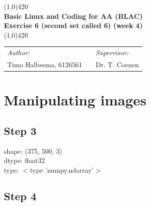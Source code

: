 \documentclass[a4paper]{article}
\begin{document}
\begin{center}
\line(1,0){420} \\
\huge \textbf{Basic Linux and Coding for AA (BLAC) \\ Exercise 6 (second set called 6) (week 4)} \\
\line(1,0){420}
\end{center}

\vfill



\begin{table}[h]
\begin{center}
\begin{tabular}{lp{5cm}l}
\textit{Author:} & & \emph{Supervisor:} \\
Timo Halbesma, 6126561 & & Dr. T. Coenen\\
\end{tabular}
\end{center}
\end{table}


\newpage
\section*{Manipulating images}
\subsection*{Step 3}
shape:  (375, 500, 3) \\
dtype:  float32  \\
type:  $<$type 'numpy.ndarray'$>$

\subsection*{Step 4}

\end{document}
